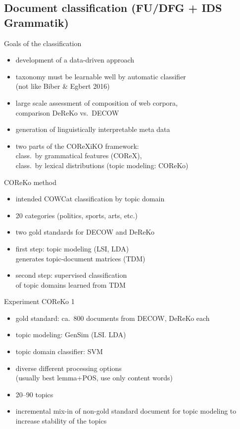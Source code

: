 \subsection{Document classification (FU/DFG + IDS Grammatik)}

\begin{frame}
  {Goals of the classification}
  \begin{itemize}
    \item development of a data-driven approach
    \item taxonomy must be learnable well by automatic classifier\\
      (\alert{not} like Biber & Egbert 2016)
    \item large scale assessment of composition of web corpora,\\
      comparison DeReKo vs.\ DECOW
    \item generation of linguistically interpretable meta data
    \item two parts of the COReXiKO framework:\\
      \alert{class.\ by grammatical features} (COReX),\\
      \alert{class.\ by lexical distributions} (topic modeling: COReKo)
  \end{itemize}
\end{frame}

\begin{frame}
  {COReKo method}
  \begin{itemize}
    \item intended COWCat classification by \alert{topic domain}
    \item 20 categories (politics, sports, arts, etc.)
    \item two gold standards for DECOW and DeReKo 
    \item first step: \alert{topic modeling} (LSI, LDA)\\
      generates topic-document matrices (TDM)
    \item second step: \alert{supervised classification}\\
      of topic domains learned from TDM
  \end{itemize}
\end{frame}

\begin{frame}
  {Experiment COReKo 1}
  \begin{itemize}
    \item gold standard: ca.\ 800 documents from DECOW, DeReKo each
    \item topic modeling: GenSim (LSI. LDA)
    \item topic domain classifier: SVM
    \item diverse different processing options\\
      (usually best lemma+POS, use only content words)
    \item 20--90 topics
    \item incremental mix-in of non-gold standard document for topic modeling to increase stability of the topics
  \end{itemize}
\end{frame}

